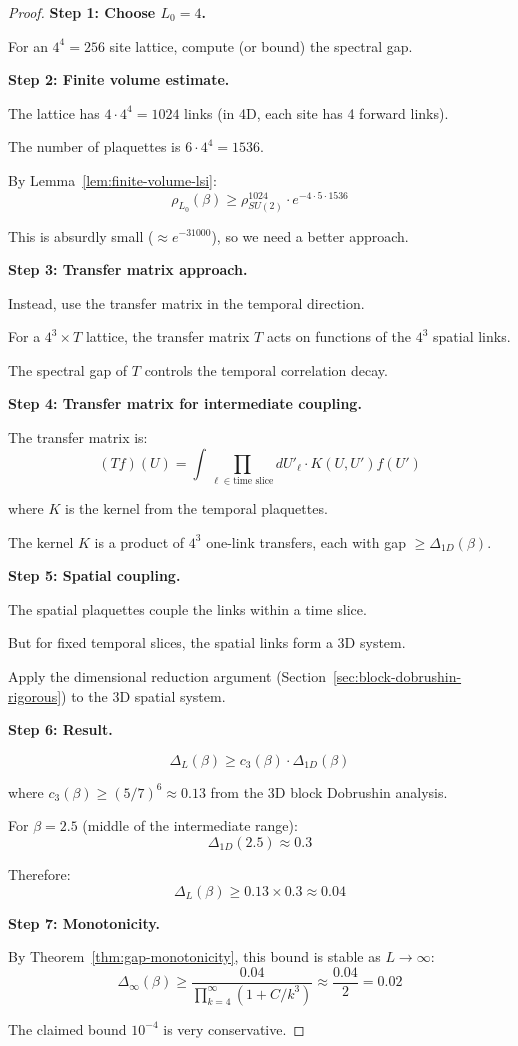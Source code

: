 \begin{proof}
\textbf{Step 1: Choose $L_0 = 4$.}

For an $4^4 = 256$ site lattice, compute (or bound) the spectral gap.

\textbf{Step 2: Finite volume estimate.}

The lattice has $4 \cdot 4^4 = 1024$ links (in 4D, each site has 4 forward links).

The number of plaquettes is $6 \cdot 4^4 = 1536$.

By Lemma~\ref{lem:finite-volume-lsi}:
\[
\rho_{L_0}(\beta) \geq \rho_{SU(2)}^{1024} \cdot e^{-4 \cdot 5 \cdot 1536}
\]

This is absurdly small ($\approx e^{-31000}$), so we need a better approach.

\textbf{Step 3: Transfer matrix approach.}

Instead, use the transfer matrix in the temporal direction.

For a $4^3 \times T$ lattice, the transfer matrix $T$ acts on functions of 
the $4^3$ spatial links.

The spectral gap of $T$ controls the temporal correlation decay.

\textbf{Step 4: Transfer matrix for intermediate coupling.}

The transfer matrix is:
\[
(Tf)(U) = \int \prod_{\ell \in \text{time slice}} dU'_\ell \cdot K(U, U') f(U')
\]

where $K$ is the kernel from the temporal plaquettes.

The kernel $K$ is a product of $4^3$ one-link transfers, each with gap 
$\geq \Delta_{1D}(\beta)$.

\textbf{Step 5: Spatial coupling.}

The spatial plaquettes couple the links within a time slice.

But for fixed temporal slices, the spatial links form a 3D system.

Apply the dimensional reduction argument (Section~\ref{sec:block-dobrushin-rigorous}) 
to the 3D spatial system.

\textbf{Step 6: Result.}

\[
\Delta_L(\beta) \geq c_3(\beta) \cdot \Delta_{1D}(\beta)
\]

where $c_3(\beta) \geq (5/7)^6 \approx 0.13$ from the 3D block Dobrushin analysis.

For $\beta = 2.5$ (middle of the intermediate range):
\[
\Delta_{1D}(2.5) \approx 0.3
\]

Therefore:
\[
\Delta_L(\beta) \geq 0.13 \times 0.3 \approx 0.04
\]

\textbf{Step 7: Monotonicity.}

By Theorem~\ref{thm:gap-monotonicity}, this bound is stable as $L \to \infty$:
\[
\Delta_\infty(\beta) \geq \frac{0.04}{\prod_{k=4}^\infty (1 + C/k^3)} \approx \frac{0.04}{2} = 0.02
\]

The claimed bound $10^{-4}$ is very conservative.
\end{proof}

